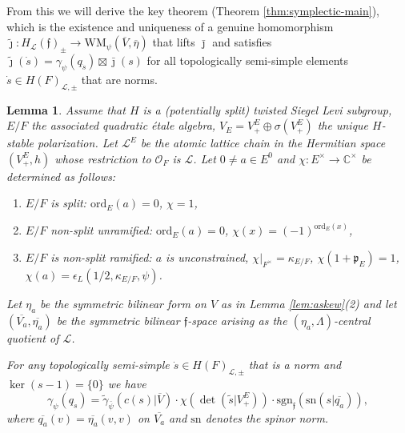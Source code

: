\documentclass{article}
\def\mf#1{\mathfrak{#1}}
\def\mc#1{\mathcal{#1}}
\def\C{\mathbb{C}}
\def\ol#1{\overline{#1}}
\def\cO{\mathcal{O}}
\newtheorem{lem}[thm]{Lemma}
\theoremstyle{definition}
\numberwithin{equation}{subsection}
\renewcommand{\-}{\hyp{}}
\newcommand{\WMuniv}{\mathrm{WM}}
\newcommand{\rf}{\mathfrak{f}}
\newcommand{\oVS}{\overline{V}}
\newcommand{\oVO}{\overline{V_a}}
\begin{document}
From this we will derive the key theorem (Theorem \ref{thm:symplectic-main}), which is the existence and uniqueness of a genuine homomorphism $\tilde\jmath : H_\mc{L}(\rf)_\pm \to \WMuniv_\psi(\oVS,\ol{\eta})$ that lifts $\bar\jmath$ and satisfies $\tilde\jmath(\dot s) = \gamma_\psi(q_{\dot s})\boxtimes \bar\jmath(s)$ for all topologically semi-simple elements $\dot s \in H(F)_{\mc{L},\pm}$ that are norms.

\begin{lem} \label{lem:tsl-gammatilde}
	Assume that $H$ is a (potentially split) twisted Siegel Levi subgroup, $E/F$ the associated quadratic \'etale algebra, $V_E = V_+^E \oplus \sigma(V_+^E)$ the unique $H$-stable polarization. Let $\mc{L}^E$ be the atomic  lattice chain in the Hermitian space $(V_+^E,h)$ whose restriction to $\cO_F$ is $\mc{L}$. Let $0 \neq a \in E^0$ and $\chi : E^\times \to \C^\times$ be determined as follows:
	\begin{enumerate}[label=(\alph*)]
		\item $E/F$ is split: $\mathrm{ord}_E(a)=0$, $\chi=1$, \item $E/F$ non-split unramified: $\mathrm{ord}_E(a)=0$, $\chi(x)=(-1)^{\mathrm{ord}_E(x)}$,
		\item $E/F$ is non-split ramified: $a$ is unconstrained, $\chi|_{F^\times}=\kappa_{E/F}$, $\chi(1+\mf{p}_E)=1$, $\chi(a)=\epsilon_L(1/2,\kappa_{E/F},\psi)$.
	\end{enumerate}
	Let $\eta_a$ be the symmetric bilinear form on $V$ as in Lemma \ref{lem:askew}(2) and
let $(\oVO,\ol{\eta_a})$ be the symmetric bilinear $\rf$-space arising as the $(\eta_a,\Lambda)$-central quotient of $\mc{L}$. 


	For any topologically semi-simple $\dot s \in H(F)_{\mc{L},\pm}$ that is a norm and $\ker(s-1) = \{0\}$ we have 
	\[ \gamma_\psi(q_{\dot s}) = \tilde\gamma_{\bar\psi}(c(s)|\oVS) \cdot \chi(\det(\tilde s|V_+^E)) \cdot  \mathrm{sgn}_\rf(\mathrm{sn}(s|\ol{q_a})),  \]
	where $\ol{q_a}(v)=\ol{\eta_a}(v,v)$ on $\oVO$ and $\mathrm{sn}$ denotes the spinor norm.
\end{lem}
\end{document}
